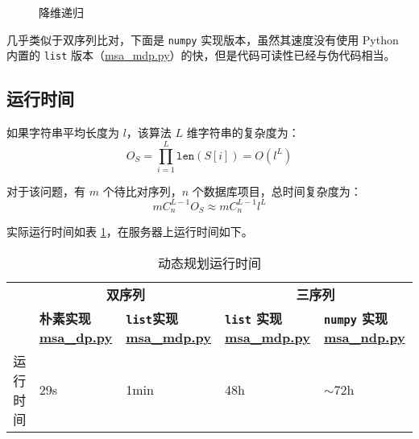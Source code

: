     \begin{figure}[H]
        \centering
        
        \caption{降维递归}\label{fig:downdim}
    \end{figure}


    几乎类似于双序列比对，下面是 \verb"numpy" 实现版本，虽然其速度没有使用 Python 内置的 \verb"list" 版本（\href{./msa\_mdp.py}{\ttfamily msa\_mdp.py}）的快，但是代码可读性已经与伪代码相当。


    \subsection{运行时间}

    如果字符串平均长度为 $l$，该算法 $L$ 维字符串的复杂度为：
    \begin{equation*}
        O_S = \prod_{i=1}^L \texttt{len}(S[i]) = O(l^L)
    \end{equation*}

    对于该问题，有 $m$ 个待比对序列，$n$ 个数据库项目，总时间复杂度为：
    \begin{equation*}
        mC_{n}^{L-1}O_S \approx mC_{n}^{L-1}l^L
    \end{equation*}

    实际运行时间如表 \ref{tab:dp}，在服务器上运行时间如下。

    \begin{table}[h]
        \centering
        \caption{动态规划运行时间}\label{tab:dp}
        \begin{tabular}{cb{3cm}b{3cm}b{3cm}b{3cm}}
            \toprule
             &\multicolumn{2}{c}{\bfseries 双序列}  &\multicolumn{2}{c}{\bfseries 三序列} \\
             \cmidrule(r){2-3}\cmidrule(r){4-5} 
             & \bfseries 朴素实现 \href{./msa\_dp.py}{\ttfamily msa\_dp.py} &\bfseries \verb"list"实现 \href{./msa\_mdp.py}{\ttfamily msa\_mdp.py} &\bfseries \verb"list" 实现 \href{./msa\_mdp.py}{\ttfamily msa\_mdp.py} &\bfseries \verb"numpy" 实现 \href{./msa\_ndp.py}{\ttfamily msa\_ndp.py} \\
            \midrule
            运行时间 & 29s & 1min & 48h & $\sim$72h \\
            \bottomrule
        \end{tabular}
    \end{table}

